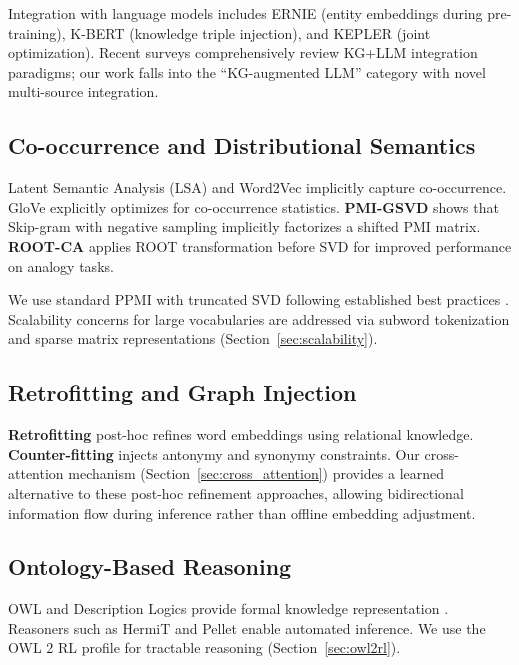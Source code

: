 \documentclass[conference]{IEEEtran}
\begin{document}
Integration with language models includes ERNIE \cite{zhang2019ernie} (entity embeddings during pre-training), K-BERT \cite{liu2020k} (knowledge triple injection), and KEPLER \cite{wang2021kepler} (joint optimization). Recent surveys \cite{pan2024unifying, sun2024thinkongraph} comprehensively review KG+LLM integration paradigms; our work falls into the ``KG-augmented LLM'' category with novel multi-source integration.

\subsection{Co-occurrence and Distributional Semantics}
\label{sec:pmi_variants}

Latent Semantic Analysis (LSA) \cite{deerwester1990indexing} and Word2Vec \cite{mikolov2013efficient} implicitly capture co-occurrence. GloVe \cite{pennington2014glove} explicitly optimizes for co-occurrence statistics. \textbf{PMI-GSVD} \cite{levy2014neural} shows that Skip-gram with negative sampling implicitly factorizes a shifted PMI matrix. \textbf{ROOT-CA} \cite{yokoi2020word} applies ROOT transformation before SVD for improved performance on analogy tasks.

We use standard PPMI with truncated SVD following established best practices \cite{levy2015improving}. Scalability concerns for large vocabularies are addressed via subword tokenization and sparse matrix representations (Section~\ref{sec:scalability}).

\subsection{Retrofitting and Graph Injection}

\textbf{Retrofitting} \cite{faruqui2015retrofitting} post-hoc refines word embeddings using relational knowledge. \textbf{Counter-fitting} \cite{mrksic2016counterfitting} injects antonymy and synonymy constraints. Our cross-attention mechanism (Section~\ref{sec:cross_attention}) provides a learned alternative to these post-hoc refinement approaches, allowing bidirectional information flow during inference rather than offline embedding adjustment.

\subsection{Ontology-Based Reasoning}

OWL and Description Logics provide formal knowledge representation \cite{gruber1993translation, mcguinness2004owl, baader2003description}. Reasoners such as HermiT \cite{glimm2014hermit} and Pellet \cite{sirin2007pellet} enable automated inference. We use the OWL 2 RL profile for tractable reasoning (Section~\ref{sec:owl2rl}).
\end{document}
